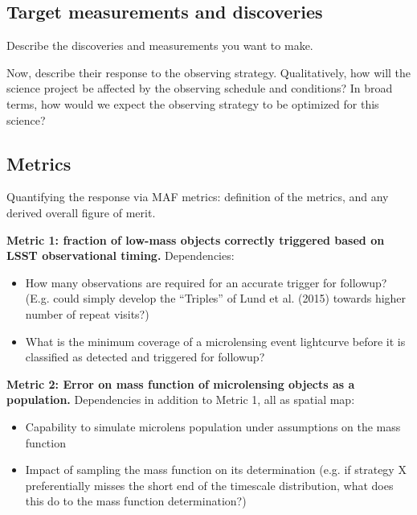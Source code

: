 
\subsection{Target measurements and discoveries}
\label{sec:\secname:targets}

Describe the discoveries and measurements you want to make.

Now, describe their response to the observing strategy. Qualitatively,
how will the science project be affected by the observing schedule and
conditions? In broad terms, how would we expect the observing strategy
to be optimized for this science?



\subsection{Metrics}
\label{sec:\secname:metrics}

Quantifying the response via MAF metrics: definition of the metrics,
and any derived overall figure of merit.

{\bf Metric 1: fraction of low-mass objects correctly triggered based
  on LSST observational timing.} Dependencies:
\begin{itemize}
  \item How many observations are required for an accurate trigger for followup? (E.g. could simply develop the ``Triples'' of Lund et al. (2015) towards higher number of repeat visits?) 
\item What is the minimum coverage of a microlensing event lightcurve before it is classified as detected and triggered for followup? 
\end{itemize}

{\bf Metric 2: Error on mass function of microlensing objects as a population.} Dependencies in addition to Metric 1, all as spatial map:
\begin{itemize}
  \item Capability to simulate microlens population under assumptions on the mass function
  \item Impact of sampling the mass function on its determination (e.g. if strategy X preferentially misses the short end of the timescale distribution, what does this do to the mass function determination?)
\end{itemize}



